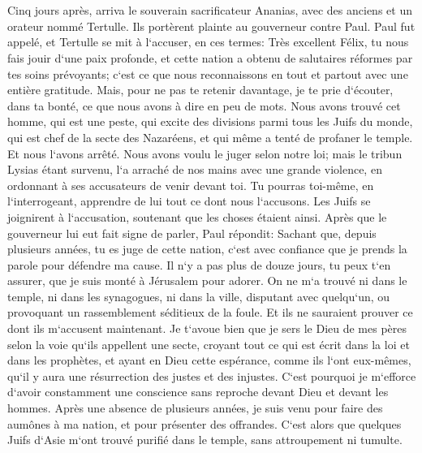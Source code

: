 \chapter{}

\verse Cinq jours après, arriva le souverain sacrificateur Ananias, avec des anciens et un orateur nommé Tertulle. Ils portèrent plainte au gouverneur contre Paul. 
\verse Paul fut appelé, et Tertulle se mit à l`accuser, en ces termes: 
\verse Très excellent Félix, tu nous fais jouir d`une paix profonde, et cette nation a obtenu de salutaires réformes par tes soins prévoyants; c`est ce que nous reconnaissons en tout et partout avec une entière gratitude. 
\verse Mais, pour ne pas te retenir davantage, je te prie d`écouter, dans ta bonté, ce que nous avons à dire en peu de mots. 
\verse Nous avons trouvé cet homme, qui est une peste, qui excite des divisions parmi tous les Juifs du monde, qui est chef de la secte des Nazaréens, 
\verse et qui même a tenté de profaner le temple. Et nous l`avons arrêté. Nous avons voulu le juger selon notre loi; 
\verse mais le tribun Lysias étant survenu, l`a arraché de nos mains avec une grande violence, 
\verse en ordonnant à ses accusateurs de venir devant toi. Tu pourras toi-même, en l`interrogeant, apprendre de lui tout ce dont nous l`accusons. 
\verse Les Juifs se joignirent à l`accusation, soutenant que les choses étaient ainsi. 
\verse Après que le gouverneur lui eut fait signe de parler, Paul répondit: Sachant que, depuis plusieurs années, tu es juge de cette nation, c`est avec confiance que je prends la parole pour défendre ma cause. 
\verse Il n`y a pas plus de douze jours, tu peux t`en assurer, que je suis monté à Jérusalem pour adorer. 
\verse On ne m`a trouvé ni dans le temple, ni dans les synagogues, ni dans la ville, disputant avec quelqu`un, ou provoquant un rassemblement séditieux de la foule. 
\verse Et ils ne sauraient prouver ce dont ils m`accusent maintenant. 
\verse Je t`avoue bien que je sers le Dieu de mes pères selon la voie qu`ils appellent une secte, croyant tout ce qui est écrit dans la loi et dans les prophètes, 
\verse et ayant en Dieu cette espérance, comme ils l`ont eux-mêmes, qu`il y aura une résurrection des justes et des injustes. 
\verse C`est pourquoi je m`efforce d`avoir constamment une conscience sans reproche devant Dieu et devant les hommes. 
\verse Après une absence de plusieurs années, je suis venu pour faire des aumônes à ma nation, et pour présenter des offrandes. 
\verse C`est alors que quelques Juifs d`Asie m`ont trouvé purifié dans le temple, sans attroupement ni tumulte. 
